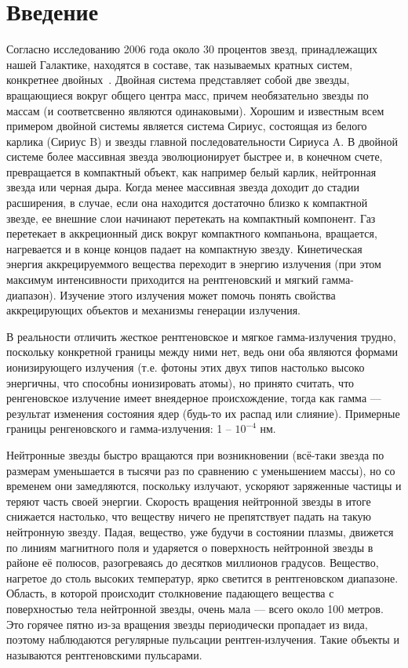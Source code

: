 
\section*{Введение}

	
	Согласно исследованию 2006 года около 30 процентов звезд, принадлежащих нашей Галактике, находятся в составе, так называемых кратных систем, конкретнее двойных~\cite{charlesj.lada}. Двойная система представляет собой две звезды, вращающиеся вокруг общего центра масс, причем необязательно звезды по массам (и соответсвенно являются одинаковыми). Хорошим и известным всем примером двойной системы является система Сириус, состоящая из белого карлика (Сириус B) и звезды главной последовательности Сириуса A. В двойной системе более массивная звезда эволюционирует быстрее и, в конечном счете, превращается в компактный объект, как например белый карлик, нейтронная звезда или черная дыра. Когда менее массивная звезда доходит до стадии расширения, в случае, если она находится достаточно близко к компактной звезде, ее внешние слои начинают перетекать на компактный компонент. Газ перетекает в аккреционный диск вокруг компактного компаньона, вращается, нагревается и в конце концов падает на компактную звезду. Кинетическая энергия аккрецируеммого вещества переходит в энергию излучения (при этом максимум интенсивности приходится на рентгеновский и мягкий гамма-диапазон). Изучение этого излучения может помочь понять свойства аккрецирующих объектов и механизмы генерации излучения.
	
	В реальности отличить жесткое рентгеновское и мягкое гамма-излучения трудно, поскольку конкретной границы между ними нет, ведь они оба являются формами ионизирующего излучения (т.е. фотоны этих двух типов настолько высоко энергичны, что способны ионизировать атомы), но принято считать, что ренгеновское излучение имеет внеядерное происхождение, тогда как гамма --- результат изменения состояния ядер (будь-то их распад или слияние). Примерные границы ренгеновского и гамма-излучения: 1 -- $10^{-4}$ нм.

	Нейтронные звезды быстро вращаются при возникновении (всё-таки звезда по размерам уменьшается в тысячи раз по сравнению с уменьшением массы), но со временем они замедляются, поскольку излучают, ускоряют заряженные частицы и теряют часть своей энергии. Скорость вращения нейтронной звезды в итоге снижается настолько, что веществу ничего не препятствует падать на такую нейтронную звезду. Падая, вещество, уже будучи в состоянии плазмы, движется по линиям магнитного поля и ударяется о поверхность нейтронной звезды в районе её полюсов, разогреваясь до десятков миллионов градусов. Вещество, нагретое до столь высоких температур, ярко светится в рентгеновском диапазоне. Область, в которой происходит столкновение падающего вещества с поверхностью тела нейтронной звезды, очень мала — всего около 100 метров. Это горячее пятно из-за вращения звезды периодически пропадает из вида, поэтому наблюдаются регулярные пульсации рентген-излучения. Такие объекты и называются рентгеновскими пульсарами. 	
	
